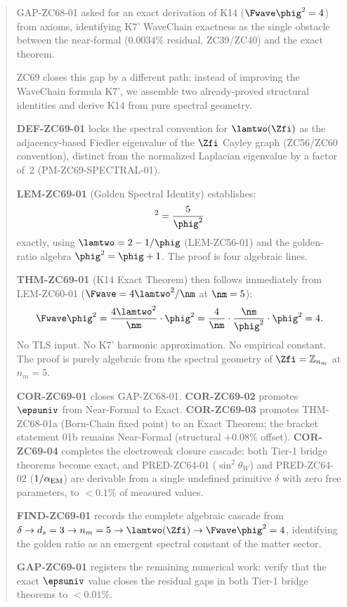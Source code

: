 \documentclass[12pt, a4paper]{article}
\renewcommand{\swsq}{\sin^2\!\theta_W}
\renewcommand{\aEM}{\alpha_{\rm EM}}
\begin{document}
\sloppy


\begin{abstract}
\sloppy
GAP-ZC68-01 asked for an exact derivation of K14
($\Fwave\phig^{2} = 4$) from axioms, identifying K7'
WaveChain exactness as the single obstacle between the
near-formal ($0.0034\%$ residual, ZC39/ZC40) and the
exact theorem.

ZC69 closes this gap by a different path: instead of
improving the WaveChain formula K7', we assemble two
already-proved structural identities and derive K14
from pure spectral geometry.

\textbf{DEF-ZC69-01} locks the spectral convention for
$\lamtwo(\Zfi)$ as the adjacency-based Fiedler eigenvalue
of the $\Zfi$ Cayley graph (ZC56/ZC60 convention), distinct
from the normalized Laplacian eigenvalue by a factor of~2
(PM-ZC69-SPECTRAL-01).

\textbf{LEM-ZC69-01} (Golden Spectral Identity) establishes:
\begin{equation*}
  [\lamtwo(\Zfi)]^{2} = \frac{5}{\phig^{2}}
\end{equation*}
exactly, using $\lamtwo = 2 - 1/\phig$ (LEM-ZC56-01)
and the golden-ratio algebra $\phig^2 = \phig + 1$.
The proof is four algebraic lines.

\textbf{THM-ZC69-01} (K14 Exact Theorem) then follows
immediately from LEM-ZC60-01 ($\Fwave = 4\lamtwo^2/\nm$
at $\nm = 5$):
\begin{equation*}
  \Fwave\phig^{2}
  = \frac{4\lamtwo^{2}}{\nm}\cdot\phig^{2}
  = \frac{4}{\nm}\cdot\frac{\nm}{\phig^{2}}\cdot\phig^{2}
  = 4.
\end{equation*}
No TLS input. No K7' harmonic approximation. No empirical
constant. The proof is purely algebraic from the spectral
geometry of $\Zfi = \mathbb{Z}_{n_m}$ at $n_m = 5$.

\textbf{COR-ZC69-01} closes GAP-ZC68-01.
\textbf{COR-ZC69-02} promotes $\epsuniv$ from Near-Formal to Exact.
\textbf{COR-ZC69-03} promotes THM-ZC68-01a (Born-Chain fixed
point) to an Exact Theorem; the bracket statement 01b remains
Near-Formal (structural $+0.08\%$ offset).
\textbf{COR-ZC69-04} completes the electroweak closure cascade:
both Tier-1 bridge theorems become exact, and PRED-ZC64-01
($\swsq$) and PRED-ZC64-02 ($1/\aEM$) are derivable from
a single undefined primitive $\delta$ with zero free parameters,
to $<0.1\%$ of measured values.

\textbf{FIND-ZC69-01} records the complete algebraic cascade
from $\delta \to d_s = 3 \to n_m = 5 \to \lamtwo(\Zfi) \to
\Fwave\phig^{2} = 4$, identifying the golden ratio as an
emergent spectral constant of the matter sector.

\textbf{GAP-ZC69-01} registers the remaining numerical work:
verify that the exact $\epsuniv$ value closes the residual
gaps in both Tier-1 bridge theorems to $<0.01\%$.
\end{abstract}
\end{document}
